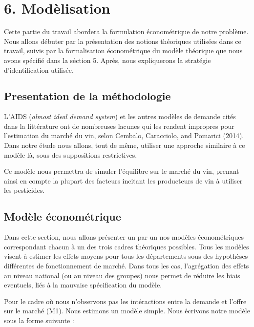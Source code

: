 \documentclass[11pt,]{article}
\begin{document}
\hypertarget{modelisation}{%
\section{6. Modèlisation}\label{modelisation}}

Cette partie du travail abordera la formulation économétrique de notre
problème. Nous allons débuter par la présentation des notions théoriques
utilisées dans ce travail, suivis par la formalisation économétrique du
modèle théorique que nous avons spécifié dans la séction 5. Après, nous
expliquerons la stratégie d'identification utilisée.

\hypertarget{presentation-de-la-methodologie}{%
\subsection{Presentation de la
méthodologie}\label{presentation-de-la-methodologie}}

L'AIDS (\emph{almost ideal demand system}) et les autres modèles de
demande cités dans la littérature ont de nombreuses lacunes qui les
rendent impropres pour l'estimation du marché du vin, selon Cembalo,
Caracciolo, and Pomarici (2014). Dans notre étude nous allons, tout de
même, utiliser une approche similaire à ce modèle là, sous des
suppositions restrictives.

Ce modèle nous permettra de simuler l'équilibre sur le marché du vin,
prenant ainsi en compte la plupart des facteurs incitant les producteurs
de vin à utiliser les pesticides.

\hypertarget{modele-econometrique}{%
\subsection{Modèle économétrique}\label{modele-econometrique}}

Dans cette section, nous allons présenter un par un nos modèles
économétriques correspondant chacun à un des trois cadres théoriques
possibles. Tous les modèles visent à estimer les effets moyens pour tous
les départements sous des hypothèses différentes de fonctionnement de
marché. Dans tous les cas, l'agrégation des effets au niveau national
(ou au niveau des groupes) nous permet de réduire les biais eventuels,
liés à la mauvaise spécification du modèle.

Pour le cadre où nous n'observons pas les intéractions entre la demande
et l'offre sur le marché (M1). Nous estimons un modèle simple. Nous
écrivons notre modèle sous la forme suivante :
\end{document}
